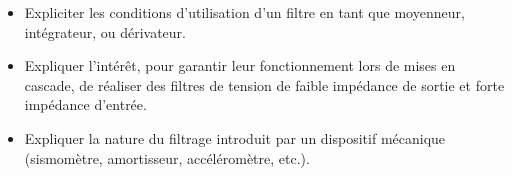 \documentclass[../../main/main.tex]{subfiles}
\begin{document}
\begin{tcn}[sidebyside,
  fontupper=\footnotesize, fontlower=\footnotesize
  ]
\begin{itemize}[label=\rcheck]
		      linéaire à une excitation sinusoïdale, à une somme finie
		      d'excitations sinusoïdales, à un signal périodique.
		\item Expliciter les conditions d'utilisation d'un filtre en tant que
		      moyenneur, intégrateur, ou dérivateur.
		\item Expliquer l'intérêt, pour garantir leur fonctionnement lors de mises
		      en cascade, de réaliser des filtres de tension de faible impédance
		      de sortie et forte impédance d'entrée.
		\item Expliquer la nature du filtrage introduit par un dispositif
		      mécanique (sismomètre, amortisseur, accéléromètre, etc.).
	\end{itemize}
\end{tcn}

\vspace*{\fill}
\newpage
\vspace*{\fill}
\end{document}
